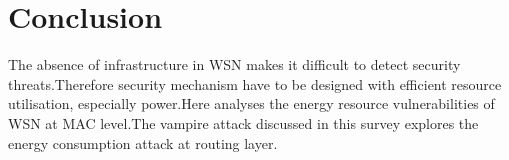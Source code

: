 \documentclass[twocolumn,10pt]{article}
\begin{document}
\section{Conclusion}

The absence of infrastructure in WSN makes  it difficult to detect security threats.Therefore security mechanism have to be designed with efficient resource utilisation, especially power.Here analyses the energy resource vulnerabilities of WSN at MAC level.The vampire attack discussed in this survey explores the energy consumption attack at routing layer.


	

\nocite{*}		

		
\end{document}
